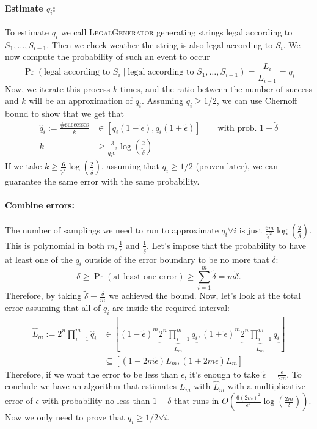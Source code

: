 \documentclass[11pt]{article}
\begin{document}
\paragraph*{Estimate $q_i$:} To estimate $q_i$ we call \textsc{LegalGenerator} generating strings legal according to $S_1,\dots,S_{i-1}$. Then we check weather the string is also legal according to $S_i$. We now compute the probability of such an event to occur
\begin{equation*}
    \Pr\left(\text{legal according to }S_i\mid \text{legal according to }S_1,\dots,S_{i-1}\right) = \frac{L_i}{L_{i-1}}=q_i
\end{equation*}
Now, we iterate this process $k$ times, and the ratio between the number of success and $k$ will be an approximation of $q_i$. Assuming $q_i\geq 1/2$, we can use Chernoff bound to show that we get that 
\begin{align*}
    \hat q_i := \frac{\#\text{successes}}{k} & \in [q_i (1-\tilde\epsilon), q_i(1+\tilde\epsilon)] \qquad \text{with prob. } 1-\tilde\delta\\
    k &\geq \frac{3}{q_i\tilde\epsilon^2}\log\left(\frac{2}{\tilde\delta}\right)
\end{align*}
If we take $k \geq \frac{6}{\tilde\epsilon^2}\log\left(\frac{2}{\tilde\delta}\right)$, assuming that $q_i\geq 1/2$ (proven later), we can guarantee the same error with the same probability.
\paragraph*{Combine errors:} The number of samplings we need to run to approximate $q_i\forall i$ is just $\frac{6m}{\tilde\epsilon^2}\log\left(\frac{2}{\tilde\delta}\right)$. This is polynomial in both $m, \frac{1}{\tilde\epsilon}$ and $\frac{1}{\tilde\delta}$. Let's impose that the probability to have at least one of the $q_i$ outside of the error boundary to be no more that $\delta$:
\begin{equation*}
    \delta \geq \Pr(\text{at least one error})\geq \sum_{i=1}^m\tilde\delta =m\tilde\delta.
\end{equation*}
Therefore, by taking $\tilde\delta = \frac{\delta}{m}$ we achieved the bound.
Now, let's look at the total error assuming that all of $q_i$ are inside the required interval:
\begin{align*}
    \hat L_m :=2^n\prod_{i=1}^m\hat q_i &\in \left[(1-\tilde\epsilon)^m\underbrace{2^n\prod_{i=1}^m q_i}_{L_m},(1+\tilde\epsilon)^m\underbrace{2^n\prod_{i=1}^m q_i}_{L_m} \right]\\
    &\subseteq \left[(1-2m\tilde\epsilon)L_m,(1+2m\tilde\epsilon)L_m\right]
\end{align*}
Therefore, if we want the error to be less than $\epsilon$, it's enough to take $\tilde\epsilon =\frac{\epsilon}{2m}$. To conclude we have an algorithm that estimates $L_m$ with $\hat L_m$ with a multiplicative error of $\epsilon$ with probability no less than $1-\delta$ that runs in $O\left(\frac{6(2m)^2}{\epsilon^2}\log\left(\frac{2m}{\delta}\right)\right)$. Now we only need to prove that $q_i\geq 1/2\forall i$. 
\end{document}
